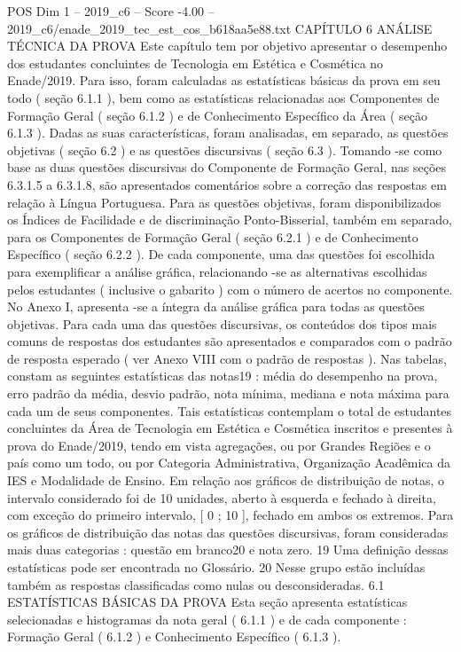 \begin{textsample}{POS Dim 1 – 2019\_c6 – Score -4.00 – 2019\_c6/enade\_2019\_tec\_est\_cos\_b618aa5e88.txt}  \label{ex:f1_pos_359}
CAPÍTULO 6 ANÁLISE TÉCNICA DA PROVA Este capítulo tem por objetivo apresentar o desempenho dos estudantes concluintes de Tecnologia em Estética e Cosmética no Enade/2019.
Para isso, foram calculadas as estatísticas básicas da prova em seu todo ( seção 6.1.1 ), bem como as estatísticas relacionadas aos Componentes de Formação Geral ( seção 6.1.2 ) e de Conhecimento Específico da Área ( seção 6.1.3 ).
Dadas as suas características, foram analisadas, em separado, as questões objetivas ( seção 6.2 ) e as questões discursivas ( seção 6.3 ).
Tomando -se como base as duas questões discursivas do Componente de Formação Geral, nas seções 6.3.1.5 a 6.3.1.8, são apresentados comentários sobre a correção das respostas em relação à Língua Portuguesa.
Para as questões objetivas, foram disponibilizados os Índices de Facilidade e de discriminação Ponto-Bisserial, também em separado, para os Componentes de Formação Geral ( seção 6.2.1 ) e de Conhecimento Específico ( seção 6.2.2 ).
De cada componente, uma das questões foi escolhida para exemplificar a análise gráfica, relacionando -se as alternativas escolhidas pelos estudantes ( inclusive o gabarito ) com o número de acertos no componente.
No Anexo I, apresenta -se a íntegra da análise gráfica para todas as questões objetivas.
Para cada uma das questões discursivas, os conteúdos dos tipos mais comuns de respostas dos estudantes são apresentados e comparados com o padrão de resposta esperado ( ver Anexo VIII com o padrão de respostas ).
Nas tabelas, constam as seguintes estatísticas das notas19 : média do desempenho na prova, erro padrão da média, desvio padrão, nota mínima, mediana e nota máxima para cada um de seus componentes.
Tais estatísticas contemplam o total de estudantes concluintes da Área de Tecnologia em Estética e Cosmética inscritos e presentes à prova do Enade/2019, tendo em vista agregações, ou por Grandes Regiões e o país como um todo, ou por Categoria Administrativa, Organização Acadêmica da IES e Modalidade de Ensino.
Em relação aos gráficos de distribuição de notas, o intervalo considerado foi de 10 unidades, aberto à esquerda e fechado à direita, com exceção do primeiro intervalo, [ 0 ; 10 ], fechado em ambos os extremos.
Para os gráficos de distribuição das notas das questões discursivas, foram consideradas mais duas categorias : questão em branco20 e nota zero. 19 Uma definição dessas estatísticas pode ser encontrada no Glossário. 20 Nesse grupo estão incluídas também as respostas classificadas como nulas ou desconsideradas. 6.1 ESTATÍSTICAS BÁSICAS DA PROVA Esta seção apresenta estatísticas selecionadas e histogramas da nota geral ( 6.1.1 ) e de cada componente : Formação Geral ( 6.1.2 ) e Conhecimento Específico ( 6.1.3 ).

\end{textsample}
